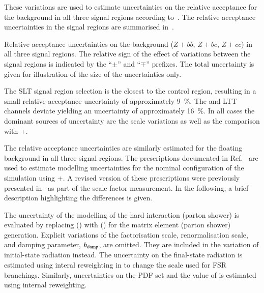 These variations are used to estimate uncertainties on the relative
acceptance for the \ZHF background in all
three signal regions according
to~. The relative acceptance
uncertainties in the signal regions are summarised
in~.

\begin{table}[htbp]
  \centering

  

  \caption{Relative acceptance uncertainties on the \ZHF background
    ($Z+bb$, $Z+bc$, $Z+cc$) in all three signal regions. The relative
    sign of the effect of variations between the signal regions is
    indicated by the ``$\pm$'' and ``$\mp$'' prefixes. The total
    uncertainty is given for illustration of the size of the
    uncertainties only.}
  \label{tab:uncertainties_zhf_extrapol}
\end{table}

The \lephad SLT signal region selection is the closest to the \ZHF
control region, resulting in a small relative acceptance uncertainty
of approximately \SI{9}{\percent}. The \hadhad and \lephad LTT
channels deviate yielding an uncertainty of approximately
\SI{16}{\percent}. In all cases the dominant sources of uncertainty
are the scale variations as well as the comparison with
\MGNLO+\PYTHIA[8].

The relative acceptance uncertainties are similarly estimated for the
floating \ttbar background in all three signal regions. The
prescriptions documented in Ref.~\cite{ATL-PHYS-PUB-2020-023} are used to
estimate modelling uncertainties for the nominal configuration of the
\ttbar simulation using \POWHEGBOX[v2]+\PYTHIA[8]. A revised version
of these prescriptions were previously presented
in~ as part of the \ttbarFakes scale
factor measurement. In the following, a brief description highlighting
the differences is given.

The uncertainty of the modelling of the hard interaction (parton
shower) is evaluated by replacing \POWHEGBOX[v2] (\PYTHIA[8]) with
\MGNLO (\HERWIG[7]) for the matrix element (parton shower)
generation. Explicit variations of the factorisation scale,
renormalisation scale, and \PYTHIA[8] damping parameter, $h_\mathrm{damp}$, are
omitted. They are included in the variation of initial-state radiation
instead. The uncertainty on the final-state radiation is estimated
using interal reweighting in \PYTHIA[8] to change the scale used for
FSR branchings. Similarly, uncertainties on the PDF set and the value
of \alphas is estimated using internal reweighting.

